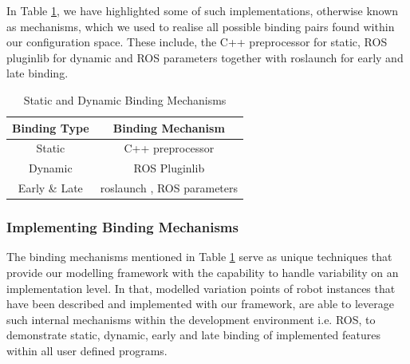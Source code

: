 \documentclass[conference]{IEEEtran}
\begin{document}
In Table \ref{tab:realmecha}, we have highlighted some of such implementations, otherwise known as mechanisms, which we used to realise all possible binding pairs found within our configuration space. These include, the C++ preprocessor for static, ROS pluginlib for dynamic and ROS parameters together with roslaunch for early and late binding.

\begin{table}[H]
	\caption{Static and Dynamic Binding Mechanisms}
	\begin{center}
		\begin{tabular}{c c}
			\hline
			Binding Type & Binding Mechanism \\ \hline
			Static & C++ preprocessor \\ \hline
			Dynamic &  ROS Pluginlib  \\ \hline
			Early \& Late &  roslaunch , ROS parameters  \\ \hline
			
		\end{tabular}
		\label{tab:realmecha}
	\end{center}
\end{table}

\subsubsection{Implementing Binding Mechanisms}
The binding mechanisms mentioned in Table \ref{tab:realmecha} serve as unique techniques that provide our modelling framework with the capability to handle variability on an implementation level. In that, modelled variation points of robot instances that have been described and implemented with our framework, are able to leverage such internal mechanisms within the development environment i.e. ROS, to demonstrate static, dynamic, early and late binding of implemented features within all user defined programs.
\end{document}
